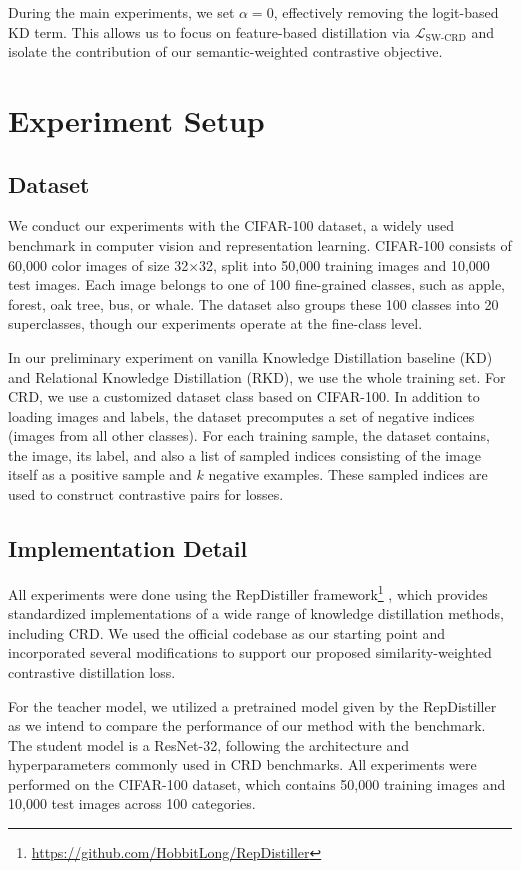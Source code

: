 \documentclass{article}
\theoremstyle{plain}
\theoremstyle{remark}
\begin{document}
During the main experiments, we set $\alpha = 0$, effectively removing the logit-based KD term. This allows us to focus on feature-based distillation via $\mathcal{L}_{\text{SW-CRD}}$ and isolate the contribution of our semantic-weighted contrastive objective.


\section{Experiment Setup}
\subsection{Dataset}
We conduct our experiments with the CIFAR-100 dataset, a widely used benchmark in computer vision and representation learning. CIFAR-100 consists of 60,000 color images of size 32×32, split into 50,000 training images and 10,000 test images. Each image belongs to one of 100 fine-grained classes, such as apple, forest, oak tree, bus, or whale. The dataset also groups these 100 classes into 20 superclasses, though our experiments operate at the fine-class level.

In our preliminary experiment on vanilla Knowledge Distillation baseline (KD) and Relational Knowledge Distillation (RKD), we use the whole training set. For CRD, we use a customized dataset class based on CIFAR-100. In addition to loading images and labels, the dataset precomputes a set of negative indices (images from all other classes). For each training sample, the dataset contains, the image, its label, and also a list of sampled indices consisting of the image itself as a positive sample and $k$ negative examples. These sampled indices are used to construct contrastive pairs for losses. 

\subsection{Implementation Detail}
All experiments were done using the RepDistiller framework\footnote{\url{https://github.com/HobbitLong/RepDistiller}}
, which provides standardized implementations of a wide range of knowledge distillation methods, including CRD. We used the official codebase as our starting point and incorporated several modifications to support our proposed similarity-weighted contrastive distillation loss. 

For the teacher model, we utilized a pretrained model given by the RepDistiller as we intend to compare the performance of our method with the benchmark. The student model is a ResNet-32, following the architecture and hyperparameters commonly used in CRD benchmarks. All experiments were performed on the CIFAR-100 dataset, which contains 50,000 training images and 10,000 test images across 100 categories.
\end{document}
